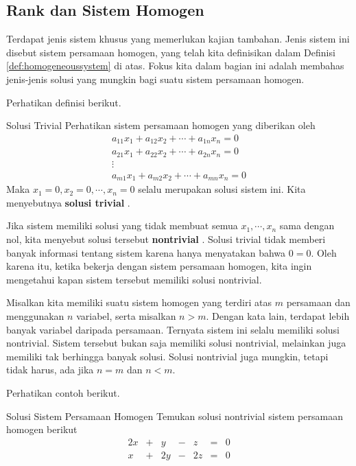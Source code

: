 \subsection{Rank dan Sistem Homogen}

Terdapat jenis sistem khusus yang memerlukan kajian tambahan. Jenis sistem ini disebut sistem persamaan
homogen, yang telah kita definisikan dalam Definisi \ref{def:homogeneoussystem} di atas.
Fokus kita dalam bagian ini adalah membahas jenis-jenis solusi yang mungkin bagi suatu sistem persamaan homogen.

Perhatikan definisi berikut.

\begin{definition}{Solusi Trivial}\label{def:trivialsolution}
Perhatikan sistem persamaan homogen yang diberikan oleh
\begin{equation*}
\begin{array}{c}
a_{11}x_{1}+a_{12}x_{2}+\cdots +a_{1n}x_{n}= 0 \\
a_{21}x_{1}+a_{22}x_{2}+\cdots +a_{2n}x_{n}= 0  \\
\vdots \\
a_{m1}x_{1}+a_{m2}x_{2}+\cdots +a_{mn}x_{n}= 0 
\end{array}
\end{equation*}
Maka $x_{1} = 0, x_{2} = 0, \cdots, x_{n} =0$ selalu merupakan
solusi sistem ini. Kita menyebutnya \textbf{solusi trivial} .
\end{definition}

Jika sistem memiliki solusi yang tidak membuat semua $x_1, \cdots, x_n$ sama dengan nol,
kita menyebut solusi tersebut \textbf{nontrivial} . Solusi trivial
tidak memberi banyak informasi tentang sistem karena hanya menyatakan bahwa $0=0$.
Oleh karena itu, ketika bekerja dengan sistem persamaan
homogen, kita ingin mengetahui kapan sistem tersebut memiliki solusi nontrivial.

Misalkan kita memiliki suatu sistem homogen yang terdiri atas $m$ persamaan dan menggunakan $n$ variabel, serta misalkan
$n > m$. Dengan kata lain, terdapat lebih banyak variabel daripada persamaan.
Ternyata sistem ini selalu memiliki solusi nontrivial. Sistem tersebut bukan saja
memiliki solusi nontrivial, melainkan juga memiliki tak berhingga banyak solusi.
Solusi nontrivial juga mungkin, tetapi tidak harus, ada jika $n=m$ dan $n<m$.

Perhatikan contoh berikut.

\begin{example}{Solusi Sistem Persamaan Homogen}\label{exa:homogeneoussolution}
Temukan solusi nontrivial sistem persamaan homogen berikut
\begin{equation*}
\begin{array}{cccccccc}
2x &+& y &-& z &=& 0 \\
x &+& 2y &-& 2z &=& 0
\end{array}
\end{equation*}
\end{example}

